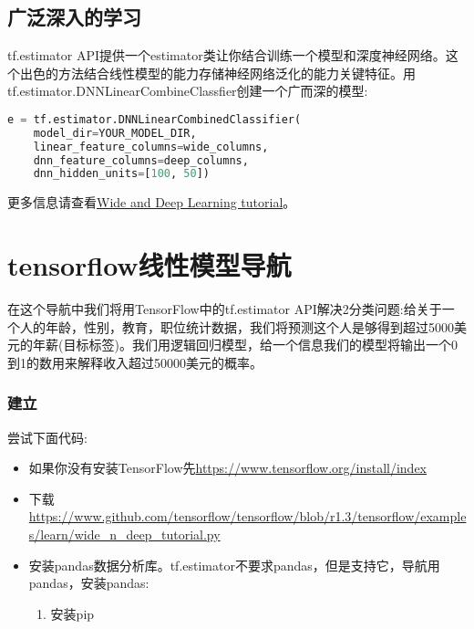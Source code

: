 \subsection{广泛深入的学习}
tf.estimator API提供一个estimator类让你结合训练一个模型和深度神经网络。这个出色的方法结合线性模型的能力存储神经网络泛化的能力关键特征。用tf.estimator.DNNLinearCombineClassfier创建一个广而深的模型:
\begin{lstlisting}[language=Python]
e = tf.estimator.DNNLinearCombinedClassifier(
    model_dir=YOUR_MODEL_DIR,
    linear_feature_columns=wide_columns,
    dnn_feature_columns=deep_columns,
    dnn_hidden_units=[100, 50])
\end{lstlisting}
更多信息请查看\href{https://www.tensorflow.org/tutorials/wide_and_deep}{Wide and Deep Learning tutorial}。
\section{tensorflow线性模型导航}
在这个导航中我们将用TensorFlow中的tf.estimator API解决2分类问题:给关于一个人的年龄，性别，教育，职位统计数据，我们将预测这个人是够得到超过5000美元的年薪(目标标签)。我们用逻辑回归模型，给一个信息我们的模型将输出一个0到1的数用来解释收入超过50000美元的概率。
\subsubsection{建立}
尝试下面代码:
\begin{itemize}
  \item 如果你没有安装TensorFlow先\href{安装}{https://www.tensorflow.org/install/index}
  \item 下载\href{导航代码}{https://www.github.com/tensorflow/tensorflow/blob/r1.3/tensorflow/examples/learn/wide\_n\_deep\_tutorial.py}
  \item 安装pandas数据分析库。tf.estimator不要求pandas，但是支持它，导航用pandas，安装pandas:
  \begin{enumerate}
    \item  安装pip
    \begin{lstlisting}[language=Bash]
    # Ubuntu/Linux 64-bit
    $ sudo apt-get install python-pip python-dev

    # Mac OS X
    $ sudo easy_install pip
    $ sudo easy_install --upgrade six
    \end{lstlisting}
    \item 安装pandas
    \begin{lstlisting}[language=Python]
    sudo pip install pandas
    \end{lstlisting}
  \end{enumerate}
  \item 指定导航带吧训练导航表述的线性模型:
  \begin{lstlisting}[language=Python]
  python wide_n_deep_tutorial.py --model_type=wide
  \end{lstlisting}
\end{itemize}

